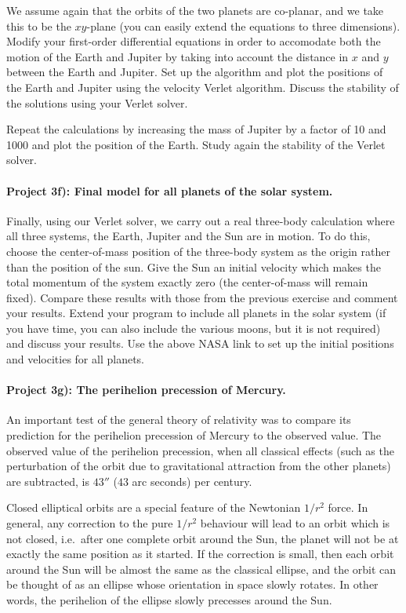 \documentclass[%
oneside,                 %
final,                   %
10pt]{article}
\begin{document}
We assume again that the orbits of the two planets are co-planar, and we take this to be the $xy$-plane (you can easily extend the equations to three dimensions). 
Modify your first-order differential equations in order to accomodate both the
motion of the Earth and Jupiter by taking into account the distance in $x$ and
$y$ between the Earth and Jupiter. Set up the algorithm and plot the positions of the Earth and Jupiter using the velocity Verlet algorithm.
Discuss the stability of the solutions using your Verlet solver.

Repeat 
the calculations by increasing the mass of Jupiter by a factor of 10 and 1000
 and plot the position of the Earth.  Study again the stability of the Verlet solver.

\paragraph{Project 3f): Final model for all planets of the solar system.}
Finally, using our Verlet solver, we carry out a real three-body calculation where all three systems, 
the Earth, Jupiter and the Sun are in motion. To do this, choose the center-of-mass position of the three-body system as 
the origin rather than the position of the sun. Give the Sun an initial velocity which makes the total momentum of the system exactly zero (the center-of-mass will remain fixed). Compare these results with those from the previous exercise and comment your results. Extend your program to include all planets in the solar system (if you have time, you can also include the various moons, but it is not required) and discuss your results. Use the above NASA link  to set up the initial positions and velocities for all planets. 


\paragraph{Project 3g): The perihelion precession of Mercury.}
An important test of the general theory of relativity was to compare its prediction for the
perihelion precession of Mercury to the observed value. The observed value of the perihelion precession, when
all classical effects (such as the perturbation of the orbit due to gravitational attraction from the other planets) are
subtracted, is $43''$ ($43$ arc seconds) per century.

Closed elliptical orbits are a special feature of the Newtonian $1/r^2$ force. In general, any correction to the
pure $1/r^2$ behaviour will lead to an orbit which is not closed, i.e.~after one complete orbit around the Sun, the
planet will not be at exactly the same position as it started. If the correction is small, then each orbit around
the Sun will be almost the same as the classical ellipse, and the orbit can be thought of as an ellipse whose 
orientation in space slowly rotates. In other words, the perihelion of the ellipse slowly precesses around the Sun.
\end{document}
